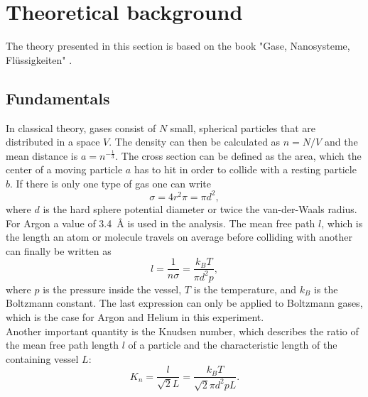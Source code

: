 \documentclass[a4paper,10pt]{article}
\begin{document}
\section{Theoretical background}
The theory presented in this section is based on the book "Gase, Nanosysteme, Flüssigkeiten" \cite{bergmann}. 

\subsection{Fundamentals}
In classical theory, gases consist of $N$ small, spherical particles  that are distributed in a space $V$. The density can then be calculated as $n = N / V$ and the mean distance is $a = n^{-\frac{1}{3}}$. The cross section can be defined as the area, which the center of a moving particle $a$ has to hit in order to collide with a resting particle $b$. If there is only one type of gas one can write 
\begin{equation}
	\sigma = 4 r^2 \pi =\pi d^2,
\end{equation}
where $d$ is the hard sphere potential diameter or twice the van-der-Waals radius. For Argon a value of \SI{3.4}{\angstrom} \cite{bergmann} is used in the analysis. The mean free path $l$, which is the length an atom or molecule travels on average before colliding with another can finally be written as 
\begin{equation}
	l = \frac{1}{n \sigma} = \frac{k_B T}{\pi d^2 p},
\end{equation}
where $p$ is the pressure inside the vessel, $T$ is the temperature, and $k_B$ is the Boltzmann constant. The last expression can only be applied to Boltzmann gases, which is the case for Argon and Helium in this experiment. \\
Another important quantity is the Knudsen number, which describes the ratio of the mean free path length $l$ of a particle and the characteristic length of the containing vessel $L$:
\begin{equation}
  K_n = \frac{l}{\sqrt{2} L} = \frac{k_B T }{\sqrt{2} \pi d^2 p L}.
\end{equation}
\end{document}
